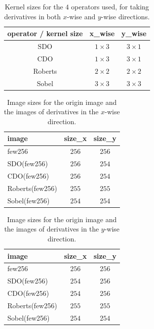 \begin{table}
	\centering
    \begin{tabular}{c|cc}
    operator / kernel size & x\_wise   & y\_wise   \\ \hline
    SDO                    & $1 \times 3$ & $3 \times 1$ \\
    CDO                    & $1 \times 3$ & $3 \times 1$ \\
    Roberts                & $2 \times 2$ & $2 \times 2$ \\
    Sobel                  & $3 \times 3$ & $3 \times 3$ \\
    \end{tabular}
    \caption{Kernel sizes for the $4$ operators used, for taking derivatives in both $x$-wise and $y$-wise directions.}
    \label{fig:Q1:kernel_sizes}
\end{table}


\begin{table}[H]
	\centering
    \begin{tabular}{l|cc}
    image           & size\_x & size\_y \\ \hline
    few256          & $256$     & $256$     \\
    SDO(few256)     & $256$     & $254$     \\
    CDO(few256)     & $256$     & $254$     \\
    Roberts(few256) & $255$     & $255$     \\
    Sobel(few256)   & $254$     & $254$     \\
    \end{tabular}
    \caption{Image sizes for the origin image and the images of derivatives in the $x$-wise direction.}
    \label{tbl:Q1:x_wise_sizes}
\end{table}

\begin{table}[H]
	\centering
    \begin{tabular}{l|cc}
    image           & size\_x & size\_y \\ \hline
    few256          & $256$     & $256$     \\
    SDO(few256)     & $254$     & $256$     \\
    CDO(few256)     & $254$     & $256$     \\
    Roberts(few256) & $255$     & $255$     \\
    Sobel(few256)   & $254$     & $254$     \\
    \end{tabular}
    \caption{Image sizes for the origin image and the images of derivatives in the $y$-wise direction.}
	\label{tbl:Q1:y_wise_sizes}
\end{table}
